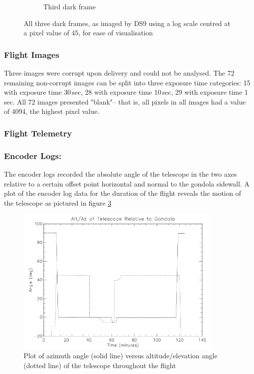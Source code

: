 \begin{figure}[h]
\begin{subfigure}{0.49\textwidth}
		\caption{Third dark frame}
		\label{fig:sub:d2}
	\end{subfigure}
	\caption{All three dark frames, as imaged by DS9 using a log scale centred at a pixel value of 45, for ease of visualisation}
\end{figure}

\subsubsection{Flight Images} 
Three images were corrupt upon delivery and could not be analysed. The 72 remaining non-corrupt images can be split into three exposure time categories: 15 with exposure time 30\,sec, 28 with exposure time 10\,sec, 29 with exposure time 1\,sec. All 72 images presented "blank"-- that is, all pixels in all images had a value of 4094, the highest pixel value. 

\newpage
\subsubsection{Flight Telemetry}

\subsubsection*{Encoder Logs:}
The encoder logs recorded the absolute angle of the telescope in the two axes relative to a certain offset point horizontal and normal to the gondola sidewall. A plot of the encoder log data for the duration of the flight reveals the motion of the telescope as pictured in figure \ref{fig:altaz}

\begin{figure}[htbp]
    \centering
    \includegraphics[width=0.9\textwidth]{appendix/img/campaign_results/altaz.jpg}
    \caption{Plot of azimuth angle (solid line) versus altitude/elevation angle (dotted line) of the telescope throughout the flight}
    \label{fig:altaz}
\end{figure}


